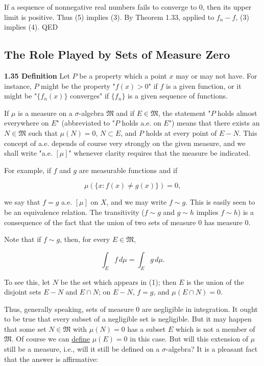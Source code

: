 \documentclass[11pt]{article}
\begin{document}
If a sequence of nonnegative real numbers fails to converge to 0, then its upper limit is positive. Thus (5) implies (3). By Theorem 1.33, applied to \(f_{n} - f\), (3) implies (4). QED
\subsection{The Role Played by Sets of Measure Zero}
\label{sec:org061e53d}

\label{orgb8e40cd}
\textbf{\textbf{1.35 Definition}} Let \(P\) be a property which a point \(x\) may or may not have. For instance, \(P\) might be the property "\(f(x) > 0\)" if \(f\) is a given function, or it might be "\(\{f_{n}(x)\}\) converges" if \(\{f_{n}\}\) is a given sequence of functions.

If \(\mu\) is a measure on a \(\sigma\)-algebra \(\mathfrak{M}\) and if \(E \in \mathfrak{M}\), the statement "\(P\) holds almost everywhere on \(E\)" (abbreviated to "\(P\) holds a.e. on \(E\)") means that there exists an \(N \in \mathfrak{M}\) such that \(\mu(N) = 0\), \(N \subset E\), and \(P\) holds at every point of \(E - N\). This concept of a.e. depends of course very strongly on the given measure, and we shall write "a.e. \([\mu]\)" whenever clarity requires that the measure be indicated.

For example, if \(f\) and \(g\) are measurable functions and if

\[
\mu(\{x : f(x) \neq g(x)\}) = 0,\tag{1}
\]

we say that \(f = g\) a.e. \([\mu]\) on \(X\), and we may write \(f \sim g\). This is easily seen to be an equivalence relation. The transitivity (\(f \sim g\) and \(g \sim h\) implies \(f \sim h\)) is a consequence of the fact that the union of two sets of measure 0 has measure 0.

Note that if \(f \sim g\), then, for every \(E \in \mathfrak{M}\),

\[
\int_{E} f \, d\mu = \int_{E} g \, d\mu. \tag{2}
\]

To see this, let \(N\) be the set which appears in (1); then \(E\) is the union of the disjoint sets \(E - N\) and \(E \cap N\); on \(E - N\), \(f = g\), and \(\mu(E \cap N) = 0\).

Thus, generally speaking, sets of measure 0 are negligible in integration. It ought to be true that every subset of a negligible set is negligible. But it may happen that some set \(N \in \mathfrak{M}\) with \(\mu(N) = 0\) has a subset \(E\) which is not a member of \(\mathfrak{M}\). Of course we can \uline{define} \(\mu(E) = 0\) in this case. But will this extension of \(\mu\) still be a measure, i.e., will it still be defined on a \(\sigma\)-algebra? It is a pleasant fact that the answer is affirmative:
\end{document}
